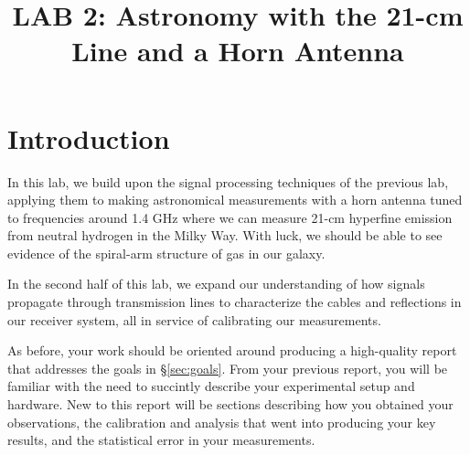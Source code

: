 \documentclass[11pt,preprint]{aastex}
\begin{document}
\def\simlt{\lower.5ex\hbox{$\; \buildrel < \over \sim \;$}}
\def\simgt{\lower.5ex\hbox{$\; \buildrel > \over \sim \;$}}

\title {LAB 2: Astronomy with the 21-cm Line and a Horn Antenna}

\tableofcontents

\section{Introduction}

\noindent
In this lab, we build upon the signal processing techniques of the previous lab,
applying them to making astronomical measurements with a horn antenna
tuned to frequencies around 1.4 GHz where we can measure 21-cm hyperfine
emission from neutral hydrogen in the Milky Way.  With luck, we should be able
to see evidence of the spiral-arm structure of gas in our galaxy.

In the second half of this lab, we expand our understanding of how signals
propagate through transmission lines to characterize the
cables and reflections in our receiver system, all in service of calibrating
our measurements.

As before, your work should be oriented around producing a high-quality report that
addresses the goals in \S\ref{sec:goals}. From your previous report, you will
be familiar with the need to succintly describe your experimental setup and hardware.
New to this report will be sections describing how you obtained your observations,
the calibration and analysis that went into producing your key results, and the
statistical error in your measurements.
\end{document}
